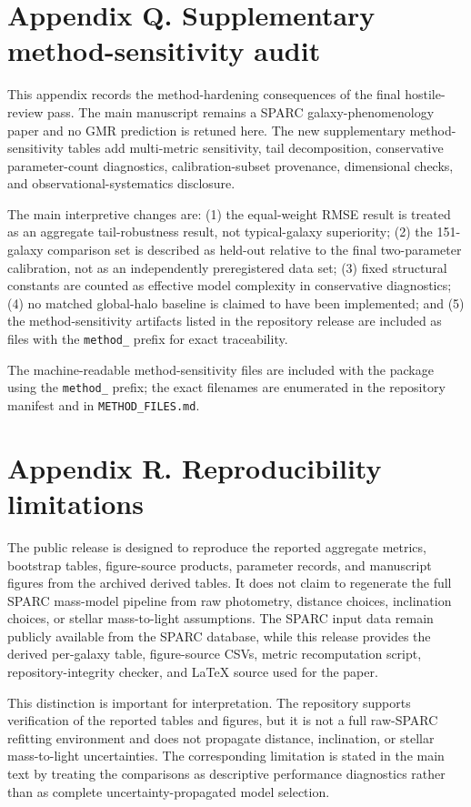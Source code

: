 \documentclass[twocolumn]{aastex701}
\begin{document}
\section{Appendix Q. Supplementary method-sensitivity audit}

This appendix records the method-hardening consequences of the final hostile-review pass. The main manuscript remains a SPARC galaxy-phenomenology paper and no GMR prediction is retuned here. The new supplementary method-sensitivity tables add multi-metric sensitivity, tail decomposition, conservative parameter-count diagnostics, calibration-subset provenance, dimensional checks, and observational-systematics disclosure.

The main interpretive changes are: (1) the equal-weight RMSE result is treated as an aggregate tail-robustness result, not typical-galaxy superiority; (2) the 151-galaxy comparison set is described as held-out relative to the final two-parameter calibration, not as an independently preregistered data set; (3) fixed structural constants are counted as effective model complexity in conservative diagnostics; (4) no matched global-halo baseline is claimed to have been implemented; and (5) the method-sensitivity artifacts listed in the repository release are included as files with the \texttt{method\_} prefix for exact traceability.

The machine-readable method-sensitivity files are included with the package using the \texttt{method\_} prefix; the exact filenames are enumerated in the repository manifest and in \texttt{METHOD\_FILES.md}.

\section{Appendix R. Reproducibility limitations}

The public release is designed to reproduce the reported aggregate metrics, bootstrap tables, figure-source products, parameter records, and manuscript figures from the archived derived tables. It does not claim to regenerate the full SPARC mass-model pipeline from raw photometry, distance choices, inclination choices, or stellar mass-to-light assumptions. The SPARC input data remain publicly available from the SPARC database, while this release provides the derived per-galaxy table, figure-source CSVs, metric recomputation script, repository-integrity checker, and LaTeX source used for the paper.

This distinction is important for interpretation. The repository supports verification of the reported tables and figures, but it is not a full raw-SPARC refitting environment and does not propagate distance, inclination, or stellar mass-to-light uncertainties. The corresponding limitation is stated in the main text by treating the comparisons as descriptive performance diagnostics rather than as complete uncertainty-propagated model selection.
\end{document}
